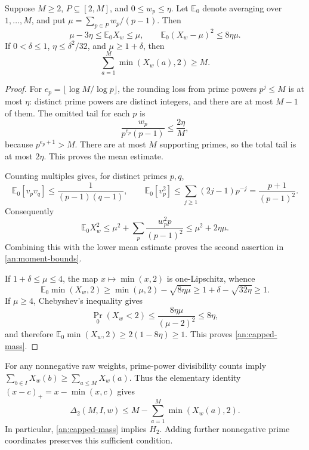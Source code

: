 \begin{lemma}
\label{an:moments}
Suppose \(M\ge2\), \(P\subseteq[2,M]\), and \(0\le w_p\le\eta\).
Let \(\mathbb E_0\) denote averaging over \(1,\ldots,M\), and put
\(\mu=\sum_{p\in P}w_p/(p-1)\). Then
\begin{equation}
 \mu-3\eta\le\mathbb E_0X_w\le\mu,
 \qquad
 \mathbb E_0(X_w-\mu)^2\le8\eta\mu.
 \label{an:moment-bounds}
\end{equation}
If \(0<\delta\le1\), \(\eta\le\delta^2/32\), and
\(\mu\ge1+\delta\), then
\begin{equation}
 \sum_{a=1}^{M}\min(X_w(a),2)\ge M.
 \label{an:capped-mass}
\end{equation}
\end{lemma}

\begin{proof}
For \(e_p=\lfloor\log M/\log p\rfloor\), the rounding loss from
prime powers \(p^j\le M\) is at most \(\eta\): distinct prime powers
are distinct integers, and there are at most \(M-1\) of them. The
omitted tail for each \(p\) is
\[
 \frac{w_p}{p^{e_p}(p-1)}\le\frac{2\eta}{M},
\]
because \(p^{e_p+1}>M\). There are at most \(M\) supporting primes,
so the total tail is at most \(2\eta\). This proves the mean estimate.

Counting multiples gives, for distinct primes \(p,q\),
\[
 \mathbb E_0[v_pv_q]\le\frac1{(p-1)(q-1)},
 \qquad
 \mathbb E_0[v_p^2]\le\sum_{j\ge1}(2j-1)p^{-j}
 =\frac{p+1}{(p-1)^2}.
\]
Consequently
\[
 \mathbb E_0X_w^2
 \le\mu^2+\sum_p\frac{w_p^2p}{(p-1)^2}
 \le\mu^2+2\eta\mu.
\]
Combining this with the lower mean estimate proves the second assertion
in \eqref{an:moment-bounds}.

If \(1+\delta\le\mu\le4\), the map \(x\mapsto\min(x,2)\) is
one-Lipschitz, whence
\[
 \mathbb E_0\min(X_w,2)
 \ge\min(\mu,2)-\sqrt{8\eta\mu}
 \ge1+\delta-\sqrt{32\eta}\ge1.
\]
If \(\mu\ge4\), Chebyshev's inequality gives
\[
 \Pr_0(X_w<2)\le\frac{8\eta\mu}{(\mu-2)^2}\le8\eta,
\]
and therefore
\(\mathbb E_0\min(X_w,2)\ge2(1-8\eta)\ge1\).
This proves \eqref{an:capped-mass}.
\end{proof}

For any nonnegative raw weights, prime-power divisibility counts imply
\(\sum_{b\in I}X_w(b)\ge\sum_{a\le M}X_w(a)\). Thus the elementary
identity \((x-c)_+=x-\min(x,c)\) gives
\begin{equation}
 \Delta_2(M,I,w)
 \le M-\sum_{a=1}^{M}\min(X_w(a),2).
 \label{an:automatic-hinge}
\end{equation}
In particular, \eqref{an:capped-mass} implies \(H_2\). Adding further
nonnegative prime coordinates preserves this sufficient condition.

